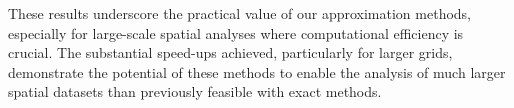 \documentclass[journal=,manuscript=]{achemso}
\begin{document}
These results underscore the practical value of our approximation
methods, especially for large-scale spatial analyses where computational
efficiency is crucial. The substantial speed-ups achieved, particularly
for larger grids, demonstrate the potential of these methods to enable
the analysis of much larger spatial datasets than previously feasible
with exact methods.
\end{document}
